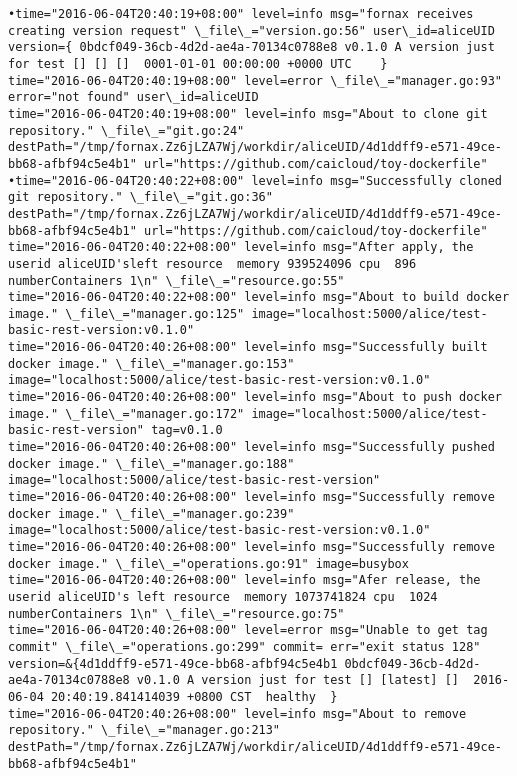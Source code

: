 \begin{lstlisting}[caption={Fornax功能性测试日志}]
•time="2016-06-04T20:40:19+08:00" level=info msg="fornax receives creating version request" \_file\_="version.go:56" user\_id=aliceUID version={ 0bdcf049-36cb-4d2d-ae4a-70134c0788e8 v0.1.0 A version just for test [] [] []  0001-01-01 00:00:00 +0000 UTC    } 
time="2016-06-04T20:40:19+08:00" level=error \_file\_="manager.go:93" error="not found" user\_id=aliceUID 
time="2016-06-04T20:40:19+08:00" level=info msg="About to clone git repository." \_file\_="git.go:24" destPath="/tmp/fornax.Zz6jLZA7Wj/workdir/aliceUID/4d1ddff9-e571-49ce-bb68-afbf94c5e4b1" url="https://github.com/caicloud/toy-dockerfile" 
•time="2016-06-04T20:40:22+08:00" level=info msg="Successfully cloned git repository." \_file\_="git.go:36" destPath="/tmp/fornax.Zz6jLZA7Wj/workdir/aliceUID/4d1ddff9-e571-49ce-bb68-afbf94c5e4b1" url="https://github.com/caicloud/toy-dockerfile" 
time="2016-06-04T20:40:22+08:00" level=info msg="After apply, the userid aliceUID'sleft resource  memory 939524096 cpu  896 numberContainers 1\n" \_file\_="resource.go:55" 
time="2016-06-04T20:40:22+08:00" level=info msg="About to build docker image." \_file\_="manager.go:125" image="localhost:5000/alice/test-basic-rest-version:v0.1.0" 
time="2016-06-04T20:40:26+08:00" level=info msg="Successfully built docker image." \_file\_="manager.go:153" image="localhost:5000/alice/test-basic-rest-version:v0.1.0" 
time="2016-06-04T20:40:26+08:00" level=info msg="About to push docker image." \_file\_="manager.go:172" image="localhost:5000/alice/test-basic-rest-version" tag=v0.1.0 
time="2016-06-04T20:40:26+08:00" level=info msg="Successfully pushed docker image." \_file\_="manager.go:188" image="localhost:5000/alice/test-basic-rest-version" 
time="2016-06-04T20:40:26+08:00" level=info msg="Successfully remove docker image." \_file\_="manager.go:239" image="localhost:5000/alice/test-basic-rest-version:v0.1.0" 
time="2016-06-04T20:40:26+08:00" level=info msg="Successfully remove docker image." \_file\_="operations.go:91" image=busybox 
time="2016-06-04T20:40:26+08:00" level=info msg="Afer release, the userid aliceUID's left resource  memory 1073741824 cpu  1024 numberContainers 1\n" \_file\_="resource.go:75" 
time="2016-06-04T20:40:26+08:00" level=error msg="Unable to get tag commit" \_file\_="operations.go:299" commit= err="exit status 128" version=&{4d1ddff9-e571-49ce-bb68-afbf94c5e4b1 0bdcf049-36cb-4d2d-ae4a-70134c0788e8 v0.1.0 A version just for test [] [latest] []  2016-06-04 20:40:19.841414039 +0800 CST  healthy  } 
time="2016-06-04T20:40:26+08:00" level=info msg="About to remove repository." \_file\_="manager.go:213" destPath="/tmp/fornax.Zz6jLZA7Wj/workdir/aliceUID/4d1ddff9-e571-49ce-bb68-afbf94c5e4b1" 

\end{lstlisting}
